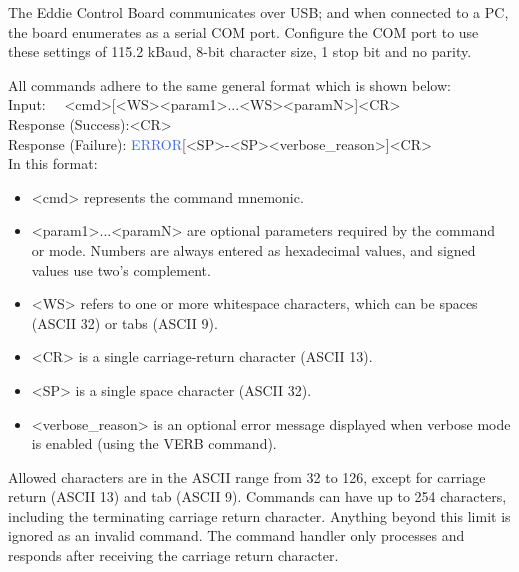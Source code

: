 The Eddie Control Board communicates over USB; and when connected to a PC, the board enumerates as a serial COM port. Configure the COM port to use these settings of 115.2 kBaud, 8-bit character size, 1 stop bit and no parity.

All commands adhere to the same general format which is shown below:\\
Input: \: \, \, \qquad \qquad \qquad \textcolor{OliveGreen}{<cmd>}[\textcolor{BrickRed}{<WS>}\textcolor{OliveGreen}{<param1>}...\textcolor{BrickRed}{<WS>}\textcolor{OliveGreen}{<paramN>}]\textcolor{BrickRed}{<CR>}\\
Response (Success):\textcolor{BrickRed}{<CR>}\\
Response (Failure): \qquad \textcolor{RoyalBlue}{ERROR}[\textcolor{BrickRed}{<SP>}-\textcolor{BrickRed}{<SP>}\textcolor{OliveGreen}{<verbose\_reason>}]\textcolor{BrickRed}{<CR>}\\

In this format:
\begin{itemize}
    \item \textcolor{OliveGreen}{<cmd>} represents the command mnemonic.
    \item \textcolor{OliveGreen}{<param1>}...\textcolor{OliveGreen}{<paramN>} are optional parameters required by the command or mode. Numbers are always entered as hexadecimal values, and signed values use two's complement.
    \item \textcolor{BrickRed}{<WS>} refers to one or more whitespace characters, which can be spaces (ASCII 32) or tabs (ASCII 9).
    \item \textcolor{BrickRed}{<CR>} is a single carriage-return character (ASCII 13).
    \item \textcolor{BrickRed}{<SP>} is a single space character (ASCII 32).
    \item \textcolor{OliveGreen}{<verbose\_reason>} is an optional error message displayed when verbose mode is enabled (using the VERB command).
\end{itemize}

Allowed characters are in the ASCII range from 32 to 126, except for carriage return (ASCII 13) and tab (ASCII 9).
Commands can have up to 254 characters, including the terminating carriage return character. Anything beyond this limit is ignored as an invalid command. The command handler only processes and responds after receiving the carriage return character.

